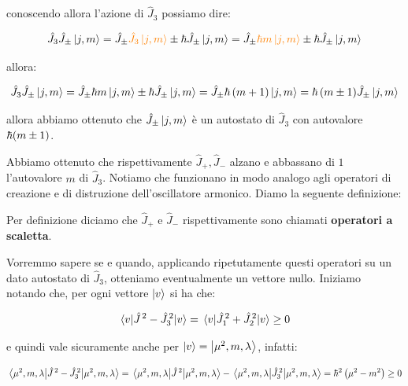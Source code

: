 \begin{myprf}
	conoscendo allora l'azione di $\hat{J}_3$ possiamo dire:

\begin{align*}
	\hat{J}_3 \hat{J}_{\pm} \ket{j, m} = \hat{J}_{\pm} \textcolor{orange}{\hat{J}_{3} \ket{j, m}} \pm \hbar \hat{J}_{\pm} \ket{j, m} = \hat{J}_{\pm} \textcolor{orange}{\hbar m \ket{j, m}}  \pm \hbar \hat{J}_{\pm} \ket{j, m}
\end{align*}

	allora:
	
\begin{align*}
	\hat{J}_3 \hat{J}_{\pm} \ket{j, m} =  \hat{J}_{\pm} \hbar m \ket{j, m}  \pm \hbar \hat{J}_{\pm} \ket{j, m} = \hat{J}_{\pm}  \hbar \,  \qty(m +1) \ket{j, m} =   \hbar \,  \qty(m \pm 1) \hat{J}_{\pm} \ket{j, m}
\end{align*}

	allora abbiamo ottenuto che $\hat{J}_{\pm} \ket{j, m}$ è un autostato di $\hat{J}_3$ con autovalore $ \hbar\qty(m \pm 1)$.

\end{myprf}

	Abbiamo ottenuto che rispettivamente $\hat{J}_+, \hat{J}_-$ alzano e abbassano di $1$ l'autovalore $m$ di $\hat{J}_3$. Notiamo che funzionano in modo analogo agli operatori di creazione e di distruzione dell'oscillatore armonico. Diamo la seguente definizione:
	
\begin{mydef}
	Per definizione diciamo che $\hat{J}_+$ e $\hat{J}_-$ rispettivamente sono chiamati \textbf{operatori a scaletta}.
\end{mydef}

	Vorremmo sapere se e quando, applicando ripetutamente questi operatori su un dato autostato di $\hat{J}_3$, otteniamo eventualmente un vettore nullo. Iniziamo notando che, per ogni vettore $\ket{v}$ si ha che:
	
\begin{align*}
	\mel{v}{\hat{J}^{\, 2} - \hat{J}^{\, 2}_3}{v} = \mel{v}{\hat{J}_1^{\, 2} + \hat{J}_2^{\, 2}}{v} \geq 0 
\end{align*}

	e quindi vale sicuramente anche per $\ket{v} = \ket{\mu^2, m, \lambda}$, infatti:

\begin{align*}
	\mel{\mu^2, m, \lambda}{\hat{J}^{\, 2} - \hat{J}^{\, 2}_3}{\mu^2, m, \lambda} = \mel{\mu^2, m, \lambda}{\hat{J}^{\, 2}}{\mu^2, m, \lambda} - \mel{\mu^2, m, \lambda}{ \hat{J}^{\, 2}_3}{\mu^2, m, \lambda}=  \hbar^2 \, \qty(\mu^2 - m^2)  \geq 0 
\end{align*}

